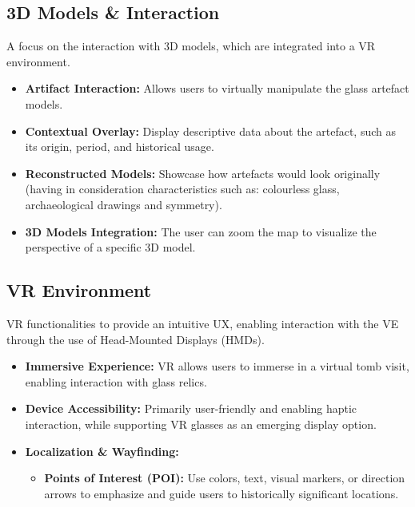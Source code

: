 \subsection*{\gls{3D} Models \& Interaction}
A focus on the interaction with \gls{3D} models, which are integrated into a \gls{VR} environment.
\begin{itemize}
    \item \textbf{Artifact Interaction:} Allows users to virtually manipulate the glass artefact models.
    \item \textbf{Contextual Overlay:} Display descriptive data about the artefact, such as its origin, period, and historical usage.
    \item \textbf{Reconstructed Models:} Showcase how artefacts would look originally (having in consideration characteristics such as: colourless glass, archaeological drawings and symmetry). 
    \item \textbf{3D Models Integration:} The user can zoom the map to visualize the perspective of a specific \gls{3D} model.
\end{itemize}

\subsection*{\gls{VR} Environment}
\gls{VR} functionalities to provide an intuitive \gls{UX}, enabling interaction with the \gls{VE} through the use of Head-Mounted Displays (\glspl{HMD}).
\begin{itemize}
    \item \textbf{Immersive Experience:} \gls{VR} allows users to immerse in a virtual tomb visit, enabling interaction with glass relics.
    \item \textbf{Device Accessibility:} Primarily user-friendly and enabling haptic interaction, while supporting \gls{VR} glasses as an emerging display option.
    \item \textbf{Localization \& Wayfinding:} 
    \begin{itemize}
        \item \textbf{Points of Interest (\gls{POI}):} Use colors, text, visual markers, or direction arrows to emphasize and guide users to historically significant locations.
    \end{itemize}
\end{itemize}

